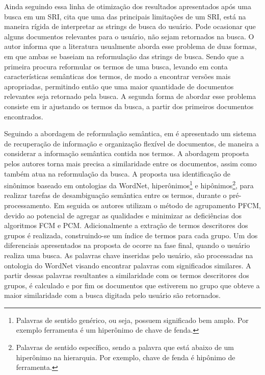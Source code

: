Ainda seguindo essa linha de otimização dos resultados apresentados após uma busca em um SRI,
 cita que uma das principais limitações de um SRI, está na maneira rígida de
interpretar as strings de busca do usuário. Pode ocasionar que alguns documentos relevantes
para o usuário, não sejam retornados na busca. O autor informa que a literatura usualmente aborda
esse problema de duas formas, em que ambas se baseiam na reformulação das strings de busca. Sendo
que a primeira procura reformular os termos de uma busca, levando em conta características
semânticas dos termos, de modo a encontrar versões mais apropriadas, permitindo então que uma maior
quantidade de documentos relevantes seja retornado pela busca. A segunda forma de abordar esse
problema consiste em ir ajustando os termos da busca, a partir dos primeiros documentos encontrados.

Seguindo a abordagem de reformulação semântica, em  é apresentado um 
sistema de recuperação de informação e organização flexível de
documentos, de maneira a considerar a informação semântica contida nos termos. A abordagem proposta pelos autores torna
mais precisa a similaridade entre os documentos, assim como também atua na reformulação da busca. 
A proposta usa
identificação de sinônimos baseado em ontologias da WordNet, 
hiperônimos\footnote{Palavras de sentido genérico, ou seja, 
  possuem significado bem amplo. Por exemplo
ferramenta é um hiperônimo de chave de fenda.} 
e hipônimos\footnote{Palavras de sentido específico, sendo a palavra que está abaixo de um 
  hiperônimo na
hierarquia. Por exemplo, chave de fenda é hipônimo de ferramenta.}, para realizar tarefas de
desambiguação semântica entre os termos, durante o pré-processamento. Em seguida os autores utilizam
o método de agrupamento PFCM, devido ao potencial de agregar as qualidades e minimizar as
deficiências dos algoritmos FCM e PCM. Adicionalmente a extração de termos descritores dos grupos é
realizada, construindo-se um índice de termos para cada grupo. Um dos diferenciais apresentados na
proposta de  ocorre na fase final, quando o usuário realiza uma busca. As palavras
chave inseridas pelo usuário, são processadas na ontologia do WordNet visando encontrar palavras
com significados similares. A partir dessas palavras resultantes a similaridade com os
termos descritores dos grupos, é calculado e por fim os documentos que estiverem no grupo que obteve a maior
similaridade com a busca digitada pelo usuário são retornados.

